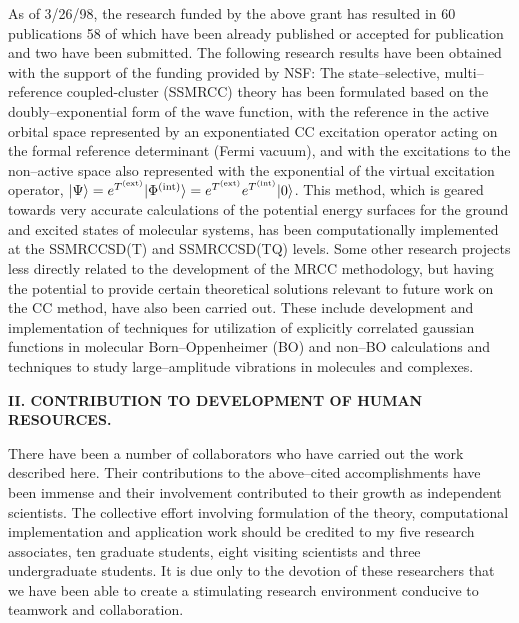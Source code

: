 As of 3/26/98, the research funded by the above 
grant has resulted in 60 publications
\cite{A1,A2,A3,A4,A5,A6,A7,A8,%
A9,A10,A11,A12,A13,A14,A15,%
A16,A17,A18,%
A19,A20,A21,A22,A23,A24,A25,%
A26,A27,A28,A29,A30,A31,A32,A33,A34,%
A35,A36,A37,%
A38,A381,A382,%
A383,A384,A385,A3851,%
A3860,%
A3861,A3862,A3863,A3864,A3865,%
A3866,A3867,A3868,A3869,A3870,A3871,%
A3872,A3873,A3874,A3875}  
58 of which
have been already published or accepted for 
publication and two have been submitted.
The following research
results have been obtained with the support 
of the funding provided by NSF:
The state--selective, multi--reference coupled-cluster  
(SSMRCC) theory has been formulated based
on the doubly--exponential form of the wave function,  
with the reference in the active orbital space represented
by an exponentiated CC excitation operator  
acting on the formal reference determinant (Fermi vacuum), and
with the excitations to the non--active space 
also represented with the exponential of the virtual excitation
operator,
$|\Psi\rangle  = e^{T^{\rm (ext)}} | \Phi^{\rm (int)}
\rangle  = e^{T^{\rm (ext)}}
e^{T^{\rm (int)}} |0\rangle$.
This method,
which is geared towards very accurate calculations of
the potential energy surfaces for the ground and excited 
states of molecular systems,
has been computationally implemented at 
the SSMRCCSD(T) and SSMRCCSD(TQ) levels. 
Some other research projects less directly related 
to the development of the MRCC methodology, but having
the potential to provide certain theoretical 
solutions relevant to future work on the CC method, have also been
carried out.  
These include 
development and implementation of   
techniques for utilization of explicitly  correlated  gaussian 
functions  in molecular Born--Oppenheimer (BO)
and non--BO 
calculations and 
techniques to study  
large--amplitude vibrations in molecules and complexes.  

\vspace{4mm}

\noindent
{\bf II.   CONTRIBUTION TO DEVELOPMENT OF HUMAN RESOURCES.}

There have been a number of collaborators who 
have carried out the work described here. Their
contributions to the above--cited accomplishments have 
been immense and their involvement contributed to their
growth as independent scientists. The collective 
effort involving formulation of the theory, computational
implementation and application work should be credited 
to my five research associates, ten graduate students,
eight visiting scientists and three undergraduate students.  
It is due only to the devotion of these researchers that
we have been able to create a stimulating research environment 
conducive to teamwork and collaboration.

